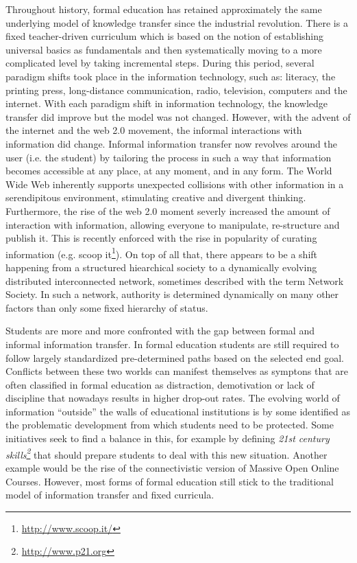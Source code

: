 \documentclass[11pt]{article}
\begin{document}
Throughout history, formal education has retained approximately the same underlying model of knowledge transfer since the industrial revolution. There is a fixed teacher-driven curriculum which is based on the notion of establishing universal basics as fundamentals and then systematically moving to a more complicated level by taking incremental steps\cite{Davis2012}. During this period, several paradigm shifts took place in the information technology, such as: literacy, the printing press, long-distance communication, radio, television, computers and the internet. With each paradigm shift in information technology, the knowledge transfer did improve but the model was not changed. However, with the advent of the internet and the web 2.0 movement, the informal interactions with information did change. Informal information transfer now revolves around the user (i.e. the student) by tailoring the process in such a way that information becomes accessible at any place, at any moment, and in any form. The World 
Wide Web inherently supports unexpected collisions with other information in a serendipitous environment, stimulating creative and divergent thinking. Furthermore, the rise of the web 2.0 moment severly increased the amount of interaction with information, allowing everyone to manipulate, re-structure and publish it. This is recently enforced with the rise in popularity of curating information (e.g. scoop it\footnote{\url{http://www.scoop.it/}}). On top of all that, there appears to be a shift happening from a structured hiearchical society to a dynamically evolving distributed interconnected network, sometimes described with the term Network Society\cite{VanDijk2012, Castells2011}. In such a network, authority is determined dynamically on many other factors than only some fixed hierarchy of status. 

Students are more and more confronted with the gap between formal and informal information transfer. In formal education students are still required to follow largely standardized pre-determined paths based on the selected end goal. Conflicts between these two worlds can manifest themselves as symptons that are often classified in formal education as distraction, demotivation or lack of discipline that nowadays results in higher drop-out rates. The evolving world of information ``outside'' the walls of educational institutions is by some identified as the problematic development from which students need to be protected. Some initiatives seek to find a balance in this, for example by defining \emph{21st century skills\footnote{\url{http://www.p21.org}}} that should prepare students to deal with this new situation. Another example would be the rise of the connectivistic version of Massive Open Online Courses. However, most forms of formal education still stick to the traditional model of information transfer 
and fixed curricula.
\end{document}

